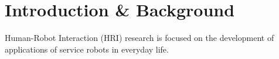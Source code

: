 \documentclass{sig-alternate-05-2015}
\begin{document}
%
%

%
%


\section{Introduction \& Background}
Human-Robot Interaction (HRI) research is focused on the development of applications of service robots in everyday life. 
%
%
%
%
%
%
%
%
%
\end{document}
